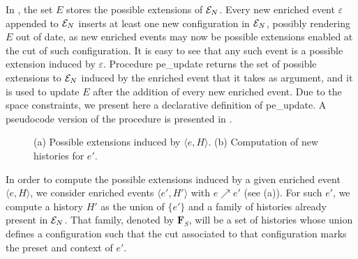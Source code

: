 \documentclass[11pt,a4paper]{article}
\newcommand{\peupdate}{\mbox{\sf pe\_update}}
\begin{document}
In , the set $E$ stores the possible extensions of
$\mathcal{E}_{N}$.  Every new enriched event $\varepsilon$ appended to $\mathcal{E}_{N}$ inserts
at least one new configuration in $\mathcal{E}_{N}$, possibly rendering $E$ out of date,
as new enriched events may now be possible extensions enabled at the cut of
such configuration.  It is easy to see that any such event is a possible
extension induced by $\varepsilon$.  Procedure \peupdate{} returns the set of
possible extensions to $\mathcal{E}_{N}$ induced by the enriched event that it takes as
argument, and it is used to update $E$ after the addition of every new enriched
event.  Due to the space constraints, we present here a declarative definition
of \peupdate{}.  A pseudocode version of the procedure is presented in
.

\begin{figure}[b]
\caption{(a) Possible extensions induced by $\langle e, H \rangle$. (b)
Computation of new histories for $e'$.}
\label{fig:possible.extensions}
\end{figure}

In order to compute the possible extensions induced by a given enriched event
$\langle e, H \rangle$, we consider enriched events $\langle e', H' \rangle$
with $e \nearrow e'$ (see  (a)).  For such $e'$, we
compute a history $H'$ as the union of $\{e'\}$ and a family of histories
already present in $\mathcal{E}_{N}$.  That family, denoted by $\mathbf{F}_S$, will be a
set of histories whose union defines a configuration such that the cut
associated to that configuration marks the preset and context of $e'$.
\end{document}

